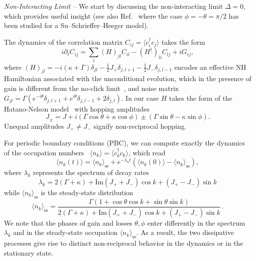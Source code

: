 \documentclass[floatfix,reprint,amsmath,amssymb,superscriptaddress,aps,prl]{revtex4-2}
\begin{document}
\emph{Non-Interacting Limit --} We start by discussing the non-interacting limit $\Delta=0$, which provides useful insight (see also Ref.~\cite{Song2019ChiralDamping} where the case $\phi=-\theta=\pi/2$ has been studied for a Su–Schrieffer–Heeger model).

The dynamics of the correlation matrix $C_{ij}=\langle c^{\dagger}_i c_j\rangle $ takes the form
\begin{equation}\label{eq:uncond}
i\partial_t C_{ij}=\sum_{l}\left(H\right)_{jl}C_{il}-
\left(H^\dagger\right)_{li}C_{lj}+iG_{ij},
\end{equation}
where $\left(H\right)_{jl}=-i\left(\kappa+\Gamma\right)\delta_{jl}-\frac{1}{2}J_{+}\delta_{j,l+1}-\frac{1}{2}J_{-}\delta_{j,l-1}$ encodes an effective NH Hamiltonian associated with the unconditional evolution, which in the presence of gain is different from the no-click limit~\cite{McDonald2022NonEq}, and noise matrix $G_{jl}=\Gamma \left(e^{-i\theta}\delta_{j,l+1}+e^{i\theta}\delta_{j,l-1} + 2\delta_{j,l}\right)$. In our case $H$ takes the form of the Hatano-Nelson model~\cite{hatano1996localization} with hopping amplitudes
\begin{equation}\label{eqn:Jpm}
J_{\pm}=J+i\left(\Gamma\cos\theta+\kappa\cos\phi\right)\pm\left(\Gamma\sin\theta-\kappa\sin\phi\right).
\end{equation}
Unequal amplitudes $J_+ \neq J_-$ signify non-reciprocal hopping.

For periodic boundary conditions (PBC), we can compute exactly the  dynamics of the occupation numbers~\cite{supplementary_mat} $\langle n_k \rangle =\langle c^\dagger_k c_k \rangle$, which read
\begin{equation}\label{eqn:nk_t}
\langle n_{k} (t) \rangle = \langle n_{k} \rangle_{\text{ss}} + e^{-\lambda_k t} \left(\langle n_{k} (0) \rangle - \langle n_{k} \rangle_{\text{ss}} \right),
\end{equation}
where $\lambda_k$ represents the spectrum of decay rates
\begin{equation}\label{eqn:spectrum}
\lambda_k=2(\Gamma+\kappa)+\mbox{Im}(J_++J_-)\cos k+
(J_+-J_-)\sin k
\end{equation}
while $\langle n_{k}\rangle_{\text{ss}}$ is the steady-state distribution
\begin{equation}\label{eqn:nkss}
\langle n_{k}\rangle_{\text{ss}} = \frac{\Gamma(1+\cos\theta\cos k+\sin\theta\sin k)}{2(\Gamma+\kappa)+\mbox{Im}(J_++J_-)\cos k+
(J_+-J_-)\sin k}\,.
\end{equation}
We note that the phases of gain and losses $\theta,\phi$ enter differently in the spectrum $\lambda_k$ and in the steady-state occupation $\langle n_{k}\rangle_{\text{ss}}$. As a result, the two dissipative processes give rise to distinct non-reciprocal behavior in the dynamics or in the stationary state.
\end{document}
